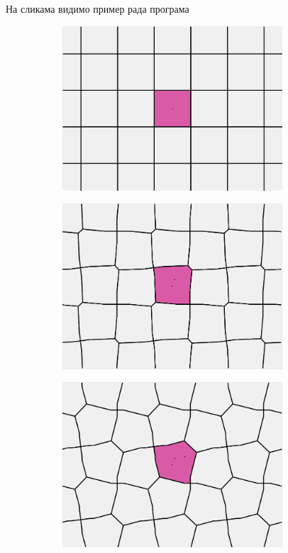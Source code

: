 \documentclass[12pt]{report}
\begin{document}
На сликама видимо пример рада програма

\begin{figure}[h]

  \begin{subfigure}[b]{0.323\textwidth}
    \includegraphics[width=0.9\textwidth]{s0.png}

  \end{subfigure}
  \begin{subfigure}[b]{0.323\textwidth}
    \includegraphics[width=0.9\textwidth]{s1.png}

  \end{subfigure}
  \begin{subfigure}[b]{0.323\textwidth}
    \includegraphics[width=0.9\textwidth]{s2.png}


\end{subfigure}
\end{figure}
\end{document}
